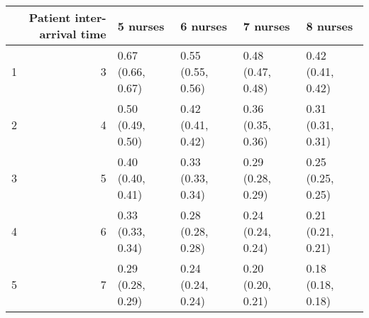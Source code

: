 \begin{table}[ht]
\centering
\begin{tabular}{rrllll}
  \hline
 & Patient inter-arrival time & 5 nurses & 6 nurses & 7 nurses & 8 nurses \\ 
  \hline
1 &   3 & 0.67 (0.66, 0.67) & 0.55 (0.55, 0.56) & 0.48 (0.47, 0.48) & 0.42 (0.41, 0.42) \\ 
  2 &   4 & 0.50 (0.49, 0.50) & 0.42 (0.41, 0.42) & 0.36 (0.35, 0.36) & 0.31 (0.31, 0.31) \\ 
  3 &   5 & 0.40 (0.40, 0.41) & 0.33 (0.33, 0.34) & 0.29 (0.28, 0.29) & 0.25 (0.25, 0.25) \\ 
  4 &   6 & 0.33 (0.33, 0.34) & 0.28 (0.28, 0.28) & 0.24 (0.24, 0.24) & 0.21 (0.21, 0.21) \\ 
  5 &   7 & 0.29 (0.28, 0.29) & 0.24 (0.24, 0.24) & 0.20 (0.20, 0.21) & 0.18 (0.18, 0.18) \\ 
   \hline
\end{tabular}
\end{table}
